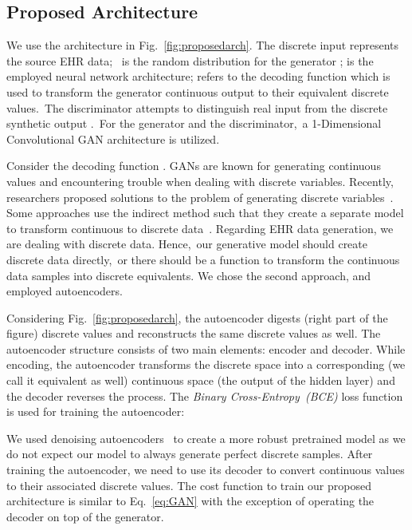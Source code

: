 \documentclass[letterpaper]{article} \usepackage{aaai20}  \usepackage{times}  \usepackage{helvet} \usepackage{courier}  \usepackage[hyphens]{url}  \usepackage{graphicx} \urlstyle{rm} \def\UrlFont{\rm}  \usepackage{graphicx}  \frenchspacing  \setlength{\pdfpagewidth}{8.5in}  \setlength{\pdfpageheight}{11in}
\begin{document}
\subsection{Proposed Architecture}\label{sec:Methodsub:ProposedArchitecture}

We use the architecture in Fig.~\ref{fig:proposedarch}.
The discrete input  represents the source EHR data;~ is the random distribution for the generator ;  is the employed neural network architecture;  refers to the decoding function which is used to transform the generator  continuous output to their equivalent discrete values.~The discriminator  attempts to distinguish real input  from the discrete synthetic output .~For the generator and the discriminator,~a 1-Dimensional Convolutional GAN architecture is utilized.

Consider the decoding function .
GANs are known for generating continuous values and encountering trouble when dealing with discrete variables.
Recently, researchers proposed solutions to the problem of generating discrete variables~\cite{hjelm2017boundary,wang2017irgan,kim2017adversarially,yu2017seqgan}.
Some approaches use the indirect method such that they create a separate model to transform continuous to discrete data~\cite{choi2017generating}.
Regarding EHR data generation, we are dealing with discrete data.
Hence,~our generative model should create discrete data directly,~or there should be a function to transform the continuous data samples into discrete equivalents.
We chose the second approach, and employed autoencoders.

Considering Fig.~\ref{fig:proposedarch}, the autoencoder digests (right part of the figure) discrete values and reconstructs the same discrete values as well.
The autoencoder structure consists of two main elements: encoder and decoder.
While encoding, the autoencoder transforms the discrete space into a corresponding (we call it equivalent as well) continuous space (the output of the hidden layer) and the decoder reverses the process.
The \textit{Binary Cross-Entropy~(BCE)} loss function is used for training the autoencoder:



We used denoising autoencoders~\cite{vincent2010stacked} to create a more robust pretrained model as we do not expect our model to always generate perfect discrete samples.
After training the autoencoder, we need to use its decoder to convert continuous values to their associated discrete values.
The cost function to train our proposed architecture is similar to Eq.~\ref{eq:GAN} with the exception of operating the decoder on top of the generator.
\end{document}
